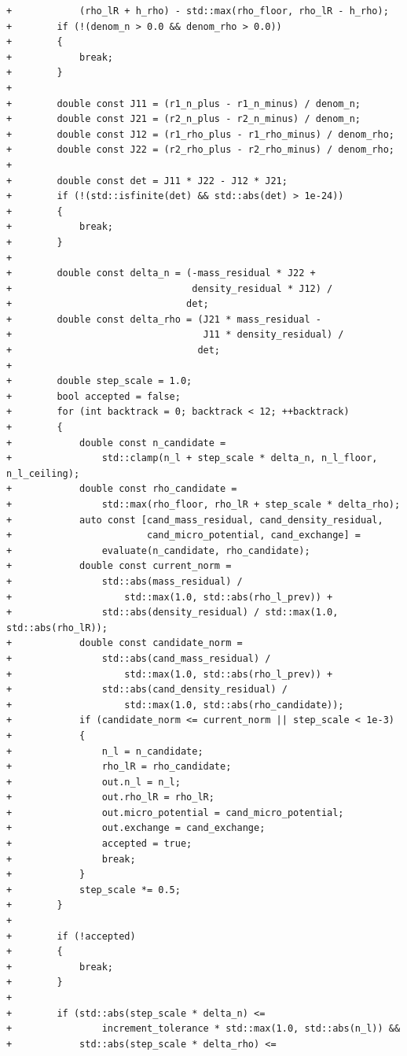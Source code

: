 \documentclass[10pt]{article}
\begin{document}
\begin{lstlisting}
+            (rho_lR + h_rho) - std::max(rho_floor, rho_lR - h_rho);
+        if (!(denom_n > 0.0 && denom_rho > 0.0))
+        {
+            break;
+        }
+
+        double const J11 = (r1_n_plus - r1_n_minus) / denom_n;
+        double const J21 = (r2_n_plus - r2_n_minus) / denom_n;
+        double const J12 = (r1_rho_plus - r1_rho_minus) / denom_rho;
+        double const J22 = (r2_rho_plus - r2_rho_minus) / denom_rho;
+
+        double const det = J11 * J22 - J12 * J21;
+        if (!(std::isfinite(det) && std::abs(det) > 1e-24))
+        {
+            break;
+        }
+
+        double const delta_n = (-mass_residual * J22 +
+                                density_residual * J12) /
+                               det;
+        double const delta_rho = (J21 * mass_residual -
+                                  J11 * density_residual) /
+                                 det;
+
+        double step_scale = 1.0;
+        bool accepted = false;
+        for (int backtrack = 0; backtrack < 12; ++backtrack)
+        {
+            double const n_candidate =
+                std::clamp(n_l + step_scale * delta_n, n_l_floor, n_l_ceiling);
+            double const rho_candidate =
+                std::max(rho_floor, rho_lR + step_scale * delta_rho);
+            auto const [cand_mass_residual, cand_density_residual,
+                        cand_micro_potential, cand_exchange] =
+                evaluate(n_candidate, rho_candidate);
+            double const current_norm =
+                std::abs(mass_residual) /
+                    std::max(1.0, std::abs(rho_l_prev)) +
+                std::abs(density_residual) / std::max(1.0, std::abs(rho_lR));
+            double const candidate_norm =
+                std::abs(cand_mass_residual) /
+                    std::max(1.0, std::abs(rho_l_prev)) +
+                std::abs(cand_density_residual) /
+                    std::max(1.0, std::abs(rho_candidate));
+            if (candidate_norm <= current_norm || step_scale < 1e-3)
+            {
+                n_l = n_candidate;
+                rho_lR = rho_candidate;
+                out.n_l = n_l;
+                out.rho_lR = rho_lR;
+                out.micro_potential = cand_micro_potential;
+                out.exchange = cand_exchange;
+                accepted = true;
+                break;
+            }
+            step_scale *= 0.5;
+        }
+
+        if (!accepted)
+        {
+            break;
+        }
+
+        if (std::abs(step_scale * delta_n) <=
+                increment_tolerance * std::max(1.0, std::abs(n_l)) &&
+            std::abs(step_scale * delta_rho) <=

\end{lstlisting}
\end{document}

